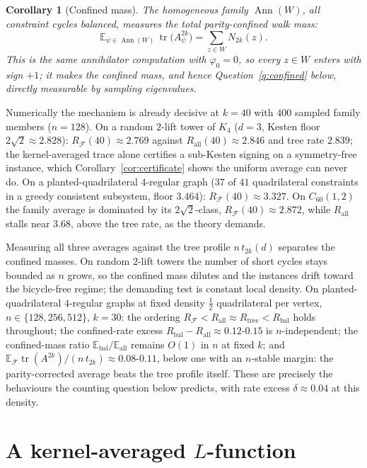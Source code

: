 \documentclass[11pt]{article}
\newtheorem{corollary}[lemma]{Corollary}
\theoremstyle{remark}
\DeclareMathOperator{\tr}{tr}
\begin{document}
\begin{corollary}[Confined mass]\label{cor:balanced}
The homogeneous family $\operatorname{Ann}(W)$, all constraint cycles
\emph{balanced}, measures the total parity-confined walk mass:
\[
\mathbb E_{\psi\in\operatorname{Ann}(W)}\,\tr\!\big(A_\psi^{2k}\big)
=\sum_{z\in W}N_{2k}(z).
\]
This is the same annihilator computation with $\varphi_0=0$, so every
$z\in W$ enters with sign $+1$; it makes the confined mass, and hence
Question~\ref{q:confined} below, directly measurable by sampling
eigenvalues.
\end{corollary}

Numerically the mechanism is already decisive at $k=40$ with $400$
sampled family members ($n=128$). On a random $2$-lift tower of $K_4$
($d=3$, Kesten floor $2\sqrt2\approx2.828$):
$R_{\mathcal F}(40)\approx2.769$ against
$R_{\mathrm{all}}(40)\approx2.846$ and tree rate $2.839$; the
kernel-averaged trace alone certifies a sub-Kesten signing on a
symmetry-free instance, which Corollary~\ref{cor:certificate} shows the
uniform average can never do. On a planted-quadrilateral $4$-regular graph ($37$ of $41$
quadrilateral constraints in a greedy consistent subsystem, floor
$3.464$):
$R_{\mathcal F}(40)\approx3.327$. On $C_{60}(1,2)$ the family average is
dominated by its $2\sqrt2$-class, $R_{\mathcal F}(40)\approx2.872$,
while $R_{\mathrm{all}}$ stalls near $3.68$, above the tree rate, as the
theory demands.

Measuring all three averages against the tree profile $n\,t_{2k}(d)$
separates the confined masses. On random $2$-lift towers the number of
short cycles stays bounded as $n$ grows, so the confined mass dilutes
and the instances drift toward the bicycle-free regime; the demanding
test is constant local density. On planted-quadrilateral $4$-regular
graphs at fixed density $\tfrac12$ quadrilateral per vertex,
$n\in\{128,256,512\}$, $k=30$: the ordering
$R_{\mathcal F}<R_{\mathrm{all}}\approx R_{\mathrm{tree}}<
R_{\mathrm{bal}}$ holds throughout; the confined-rate excess
$R_{\mathrm{bal}}-R_{\mathrm{all}}\approx0.12$-$0.15$ is
$n$-independent; the confined-mass ratio
$\mathbb E_{\mathrm{bal}}/\mathbb E_{\mathrm{all}}$ remains $O(1)$ in
$n$ at fixed $k$; and
$\mathbb E_{\mathcal F}\tr(A^{2k})/(n\,t_{2k})\approx0.08$-$0.11$,
below one with an $n$-stable margin: the parity-corrected average
beats the tree profile itself. These are precisely the behaviours the
counting question below predicts, with rate excess $\delta\approx0.04$
at this density.

\section{A kernel-averaged $L$-function}\label{sec:zeta}
\end{document}

